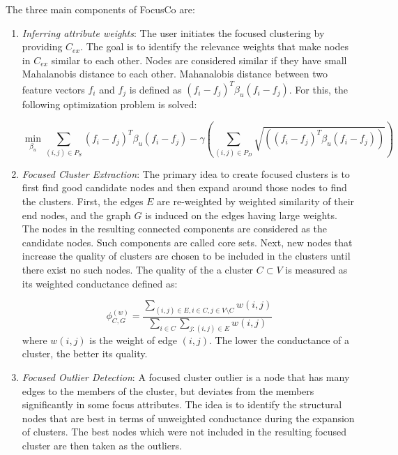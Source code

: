 \documentclass[11pt, oneside]{article}   	%
\begin{document}
\quad The three main components of FocusCo are:
\begin{enumerate}
\item \emph{Inferring attribute weights}: 
The user initiates the focused clustering by providing $C_{ex}$.
The goal is to identify the relevance weights that make nodes in $C_{ex}$ similar to each other. Nodes are considered similar if they have small Mahalanobis distance to each other.
Mahanalobis distance between two feature vectors $f_i$ and $f_j$ is defined as $(f_i - f_j)^T\beta_u(f_i-f_j)$. For this, the following optimization problem is solved:

\begin{equation*}
\min_{\beta_u} \sum_{(i,j) \in P_S}(f_i - f_j)^T\beta_u(f_i-f_j) - \gamma \left( \sum_{(i,j) \in P_D} \sqrt{((f_i - f_j)^T\beta_u(f_i-f_j))} \right)
\end{equation*}  

\item \emph{Focused Cluster Extraction}: 
The primary idea to create focused clusters is to first find good candidate nodes and then expand around those nodes to find the clusters.
First, the edges $E$ are re-weighted by weighted similarity of their end nodes, and the graph $G$ is induced on the edges having large weights.
The nodes in the resulting connected components are considered as the candidate nodes. Such components are called core sets.
Next, new nodes that increase the quality of clusters are chosen to be included in the clusters until there exist no such nodes.
The quality of the a cluster $C \subset V$ is measured as its weighted conductance defined as:

\begin{equation*}
\phi^{(w)}_{C, G} = \frac {\sum\limits_{(i,j)\in E, i\in C, j\in V\setminus C}w(i,j)} 
														  {\sum\limits_{i\in C} \sum\limits_{j:(i,j)\in E}w(i,j)} %
\end{equation*}
where $w(i,j)$ is the weight of edge $(i, j)$.
The lower the conductance of a cluster, the better its quality.

\item \emph{Focused Outlier Detection}:
A focused cluster outlier is a node that has many edges to the members of the cluster, but deviates from the members significantly in some focus attributes.
The idea is to identify the structural nodes that are best in terms of unweighted conductance during the expansion of clusters.
The best nodes which were not included in the resulting focused cluster are then taken as the outliers.
\end{enumerate}
\end{document}
